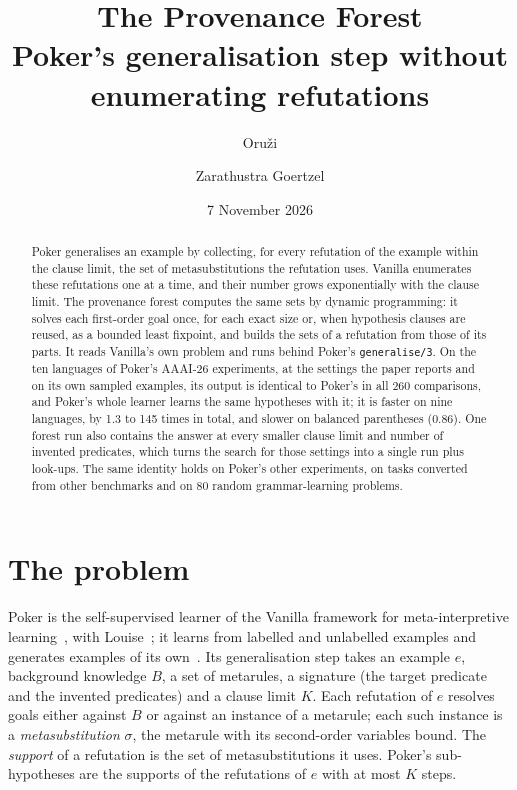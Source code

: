 \documentclass[11pt]{article}
\title{\textbf{The Provenance Forest}\\[1mm]
\large Poker's generalisation step without enumerating refutations}
\author{Oru\v{z}i \and Zarathustra Goertzel}
\date{7 November 2026}
\begin{document}
\maketitle

\begin{abstract}
Poker generalises an example by collecting, for every refutation of the example
within the clause limit, the set of metasubstitutions the refutation uses. Vanilla
enumerates these refutations one at a time, and their number grows exponentially
with the clause limit. The provenance forest computes the same sets by dynamic
programming: it solves each first-order goal once, for each exact size or, when
hypothesis clauses are reused, as a bounded least fixpoint, and builds the sets of a
refutation from those of its parts. It reads Vanilla's own problem and runs behind
Poker's \nolinkurl{generalise/3}. On the ten languages of Poker's AAAI-26 experiments, at
the settings the paper reports and on its own sampled examples, its output is
identical to Poker's in all 260 comparisons, and Poker's whole learner learns the same
hypotheses with it; it is faster on nine languages, by 1.3 to 145 times in total, and
slower on balanced parentheses (0.86). One forest run also contains the answer at
every smaller clause limit and number of invented predicates, which turns the search
for those settings into a single run plus look-ups. The same identity holds on Poker's
other experiments, on tasks converted from other benchmarks and on 80 random
grammar-learning problems.
\end{abstract}

\section{The problem}

Poker is the self-supervised learner of the Vanilla framework for
meta-interpretive learning~\cite{vanilla,trewern}, with Louise~\cite{louise}; it
learns from labelled and unlabelled examples and generates examples of its
own~\cite{ssilp}. Its
generalisation step takes an example $e$, background knowledge $B$, a set of
metarules, a signature (the target predicate and the invented predicates) and a
clause limit $K$. Each refutation of $e$ resolves goals either against $B$ or against
an instance of a metarule; each such instance is a \emph{metasubstitution} $\sigma$,
the metarule with its second-order variables bound. The \emph{support} of a refutation
is the set of metasubstitutions it uses. Poker's sub-hypotheses are the supports of
the refutations of $e$ with at most $K$ steps.
\end{document}

